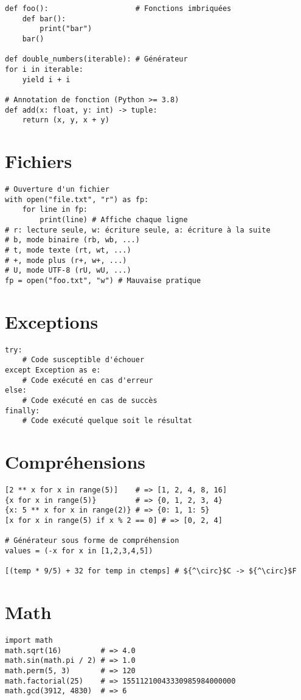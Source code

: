 \documentclass[9pt]{extarticle}
\begin{document}
\begin{multicols*}{4}
\begin{lstlisting}
def foo():                    # Fonctions imbriquées
    def bar():
        print("bar")
    bar()

def double_numbers(iterable): # Générateur
for i in iterable:
    yield i + i

# Annotation de fonction (Python >= 3.8)
def add(x: float, y: int) -> tuple:
    return (x, y, x + y)
\end{lstlisting}

\section*{Fichiers}
\begin{lstlisting}
# Ouverture d'un fichier
with open("file.txt", "r") as fp:
    for line in fp:
        print(line) # Affiche chaque ligne
# r: lecture seule, w: écriture seule, a: écriture à la suite
# b, mode binaire (rb, wb, ...)
# t, mode texte (rt, wt, ...)
# +, mode plus (r+, w+, ...)
# U, mode UTF-8 (rU, wU, ...)
fp = open("foo.txt", "w") # Mauvaise pratique
\end{lstlisting}

\section*{Exceptions}
\begin{lstlisting}
try:
    # Code susceptible d'échouer
except Exception as e:
    # Code exécuté en cas d'erreur
else:
    # Code exécuté en cas de succès
finally:
    # Code exécuté quelque soit le résultat
\end{lstlisting}

\section*{Compréhensions}
\begin{lstlisting}[mathescape]
[2 ** x for x in range(5)]    # => [1, 2, 4, 8, 16]
{x for x in range(5)}         # => {0, 1, 2, 3, 4}
{x: 5 ** x for x in range(2)} # => {0: 1, 1: 5}
[x for x in range(5) if x % 2 == 0] # => [0, 2, 4]

# Générateur sous forme de compréhension
values = (-x for x in [1,2,3,4,5])

[(temp * 9/5) + 32 for temp in ctemps] # ${^\circ}$C -> ${^\circ}$F
\end{lstlisting}

\section*{Math}
\begin{lstlisting}
import math
math.sqrt(16)         # => 4.0
math.sin(math.pi / 2) # => 1.0
math.perm(5, 3)       # => 120
math.factorial(25)    # => 15511210043330985984000000
math.gcd(3912, 4830)  # => 6
\end{lstlisting}


\end{multicols*}
\end{document}
